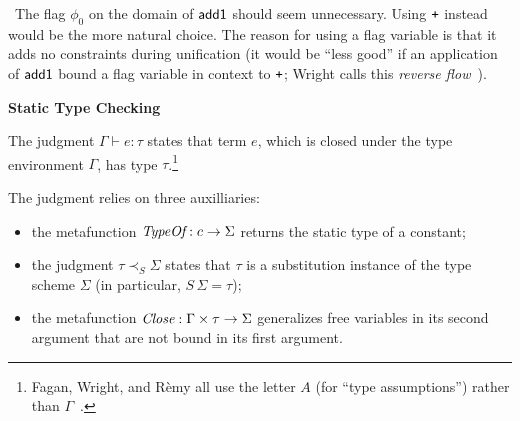 \documentclass{article}
\begin{document}
\noindent \noway~The flag $\phi_0$ on the domain of $\mathsf{add1}$ should seem unnecessary.
Using $\texttt{+}$ instead would be the more natural choice.
The reason for using a flag variable is that it adds no constraints during
 unification (it would be ``less good'' if an application of $\mathsf{add1}$ bound
 a flag variable in context to $\texttt{+}$; Wright calls this \emph{reverse flow}~\cite{w-thesis-1994}).


\noindent \textbf{Static Type Checking}

The judgment $\Gamma \vdash e : \tau$ states that term $e$, which is closed
 under the type environment $\Gamma$, has type $\tau$.\footnote{Fagan, Wright, and R\`{e}my all use the letter $A$ (for ``type assumptions'') rather than $\Gamma$~\cite{r-popl-1989, f-thesis-1991, w-thesis-1994}.}

The judgment relies on three auxilliaries:
\begin{itemize}
\item the metafunction $\emph{TypeOf} : c \rightarrow \Sigma$ returns
       the static type of a constant;
\item the judgment $\tau \prec_S \Sigma$
      states that $\tau$ is a substitution instance of the type scheme $\Sigma$ (in
      particular, $S\,\Sigma = \tau$);
\item the metafunction $\emph{Close} : \Gamma \times \tau \rightarrow \Sigma$
      generalizes free variables in its second argument that are not bound in
      its first argument.
\end{itemize}
\end{document}
